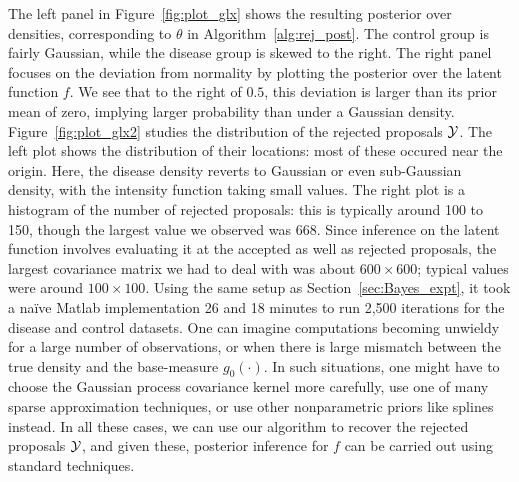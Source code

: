   The left panel in Figure~\ref{fig:plot_glx} shows the resulting posterior over densities, corresponding to $\theta$ in Algorithm~\ref{alg:rej_post}.
The control group is fairly Gaussian, while the disease group is skewed to the right.
The right panel focuses on the deviation from normality by plotting the posterior over the latent function $f$. 
We see that to the right of $0.5$, this deviation is larger than its prior mean of zero, implying larger probability than under a Gaussian density.
Figure~\ref{fig:plot_glx2} studies the distribution of the rejected proposals $\mathcal{Y}$.
The left plot shows the distribution of their locations:
most of these occured near the origin. Here, the disease density reverts to Gaussian or even sub-Gaussian density, with the intensity function taking small 
values.  The right plot is a histogram of the number of rejected proposals: this is typically 
around 100 to 150, though
the largest value we observed was $668$. Since inference on the latent function involves evaluating it at the accepted as
well as rejected proposals, the largest covariance matrix we had to deal with was about $600 \times 600$; typical values were around $100 \times 100$. Using
the same setup as Section~\ref{sec:Bayes_expt}, it took a na\"ive Matlab implementation 26 and 18 minutes to run 2,500 iterations for the
disease and control datasets. One can imagine 
computations becoming unwieldy for a large number of observations, or when there is large mismatch between the true density and the base-measure $g_0(\cdot)$. 
In such situations, one might have to choose the Gaussian process covariance kernel more carefully, use one of many sparse approximation techniques,
or use other nonparametric priors like splines instead. In all these cases, we can use our algorithm to recover the rejected proposals $\mathcal{Y}$, 
and given these, posterior inference for $f$ 
can be carried out using standard techniques.

